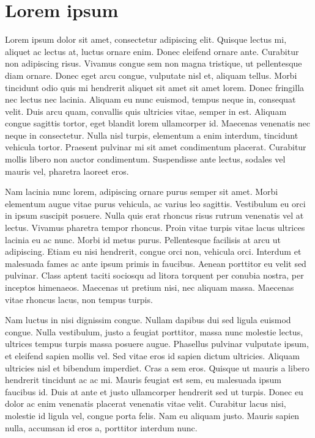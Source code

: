 \section{Lorem ipsum}
Lorem ipsum dolor sit amet, consectetur adipiscing elit. Quisque lectus
mi, aliquet ac lectus at, luctus ornare enim. Donec eleifend ornare
ante. Curabitur non adipiscing risus. Vivamus congue sem non magna
tristique, ut pellentesque diam ornare. Donec eget arcu congue, vulputate
nisl et, aliquam tellus. Morbi tincidunt odio quis mi hendrerit aliquet
sit amet sit amet lorem. Donec fringilla nec lectus nec lacinia. Aliquam
eu nunc euismod, tempus neque in, consequat velit. Duis arcu quam,
convallis quis ultricies vitae, semper in est. Aliquam congue sagittis
tortor, eget blandit lorem ullamcorper id. Maecenas venenatis nec
neque in consectetur. Nulla nisl turpis, elementum a enim interdum,
tincidunt vehicula tortor. Praesent pulvinar mi sit amet condimentum
placerat. Curabitur mollis libero non auctor condimentum. Suspendisse
ante lectus, sodales vel mauris vel, pharetra laoreet eros.

Nam lacinia nunc lorem, adipiscing ornare purus semper sit amet. Morbi
elementum augue vitae purus vehicula, ac varius leo sagittis. Vestibulum
eu orci in ipsum suscipit posuere. Nulla quis erat rhoncus risus rutrum
venenatis vel at lectus. Vivamus pharetra tempor rhoncus. Proin vitae
turpis vitae lacus ultrices lacinia eu ac nunc. Morbi id metus purus.
Pellentesque facilisis at arcu ut adipiscing. Etiam eu nisi hendrerit,
congue orci non, vehicula orci. Interdum et malesuada fames ac ante
ipsum primis in faucibus. Aenean porttitor eu velit sed pulvinar.
Class aptent taciti sociosqu ad litora torquent per conubia nostra,
per inceptos himenaeos. Maecenas ut pretium nisi, nec aliquam massa.
Maecenas vitae rhoncus lacus, non tempus turpis.

Nam luctus in nisi dignissim congue. Nullam dapibus dui sed ligula
euismod congue. Nulla vestibulum, justo a feugiat porttitor, massa
nunc molestie lectus, ultrices tempus turpis massa posuere augue.
Phasellus pulvinar vulputate ipsum, et eleifend sapien mollis vel.
Sed vitae eros id sapien dictum ultricies. Aliquam ultricies nisl
et bibendum imperdiet. Cras a sem eros. Quisque ut mauris a libero
hendrerit tincidunt ac ac mi. Mauris feugiat est sem, eu malesuada
ipsum faucibus id. Duis at ante et justo ullamcorper hendrerit sed
ut turpis. Donec eu dolor ac enim venenatis placerat venenatis vitae
velit. Curabitur lacus nisi, molestie id ligula vel, congue porta
felis. Nam eu aliquam justo. Mauris sapien nulla, accumsan id eros
a, porttitor interdum nunc.

